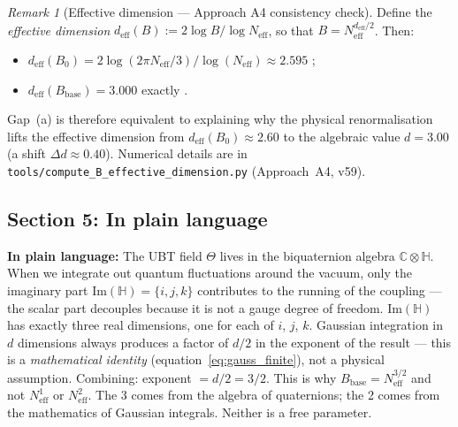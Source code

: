 \documentclass[11pt,a4paper]{article}
\theoremstyle{definition}
\theoremstyle{remark}
\newtheorem{remark}{Remark}
\begin{document}
\begin{remark}[Effective dimension — Approach A4 consistency check]
  \label{rem:d_eff}
  Define the \emph{effective dimension} $d_{\mathrm{eff}}(B) := 2\log B / \log N_{\mathrm{eff}}$,
  so that $B = N_{\mathrm{eff}}^{d_{\mathrm{eff}}/2}$.  Then:
  \begin{itemize}
    \item $d_{\mathrm{eff}}(B_0) = 2\log(2\pi N_{\mathrm{eff}}/3)/\log(N_{\mathrm{eff}}) \approx 2.595$
      ;
    \item $d_{\mathrm{eff}}(B_{\mathrm{base}}) = 3.000$ exactly \quad
      [integer = $\dim_\mathbb{R}(\mathrm{Im}\,\mathbb{H})$, algebraic identity].
  \end{itemize}
  Gap~(a) is therefore equivalent to explaining why the physical renormalisation
  lifts the effective dimension from $d_{\mathrm{eff}}(B_0) \approx 2.60$ to
  the algebraic value $d = 3.00$ (a shift $\Delta d \approx 0.40$).
  Numerical details are in \texttt{tools/compute\_B\_effective\_dimension.py}
  (Approach~A4, v59).
\end{remark}

\subsection{Section 5: In plain language}
\label{sec:plain}

\textbf{In plain language:}
The UBT field $\Theta$ lives in the biquaternion algebra $\mathbb{C}\otimes\mathbb{H}$.
When we integrate out quantum fluctuations around the vacuum,
only the imaginary part $\mathrm{Im}(\mathbb{H}) = \{i, j, k\}$ contributes to
the running of the coupling — the scalar part decouples because it is not a
gauge degree of freedom.
$\mathrm{Im}(\mathbb{H})$ has exactly three real dimensions, one for each of $i$, $j$, $k$.
Gaussian integration in $d$ dimensions always produces a factor of $d/2$ in the
exponent of the result — this is a \emph{mathematical identity}
(equation~\eqref{eq:gauss_finite}), not a physical assumption.
Combining: exponent $= d/2 = 3/2$.
This is why $B_{\mathrm{base}} = N_{\mathrm{eff}}^{3/2}$ and not $N_{\mathrm{eff}}^1$
or $N_{\mathrm{eff}}^2$.
The 3 comes from the algebra of quaternions; the 2 comes from the mathematics of
Gaussian integrals.
Neither is a free parameter.

\ifdefined\INCLUDEMODE\else
\end{document}
